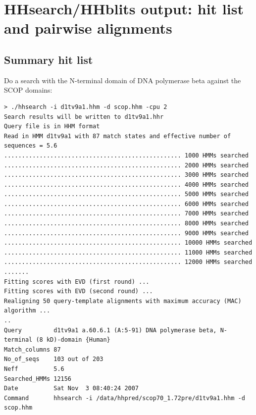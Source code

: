 \documentclass[11pt,a4paper]{article}
\begin{document}
\section{HHsearch/HHblits output: hit list and pairwise alignments}

\subsection{Summary hit list}

Do a search with the N-terminal domain of DNA polymerase beta against the SCOP domains:


\scriptsize\begin{verbatim}
> ./hhsearch -i d1tv9a1.hhm -d scop.hhm -cpu 2
Search results will be written to d1tv9a1.hhr
Query file is in HHM format
Read in HMM d1tv9a1 with 87 match states and effective number of sequences = 5.6
.................................................. 1000 HMMs searched
.................................................. 2000 HMMs searched
.................................................. 3000 HMMs searched
.................................................. 4000 HMMs searched
.................................................. 5000 HMMs searched
.................................................. 6000 HMMs searched
.................................................. 7000 HMMs searched
.................................................. 8000 HMMs searched
.................................................. 9000 HMMs searched
.................................................. 10000 HMMs searched
.................................................. 11000 HMMs searched
.................................................. 12000 HMMs searched
.......
Fitting scores with EVD (first round) ...
Fitting scores with EVD (second round) ...
Realigning 50 query-template alignments with maximum accuracy (MAC) algorithm ...
..
Query         d1tv9a1 a.60.6.1 (A:5-91) DNA polymerase beta, N-terminal (8 kD)-domain {Human} 
Match_columns 87
No_of_seqs    103 out of 203
Neff          5.6 
Searched_HMMs 12156
Date          Sat Nov  3 08:40:24 2007
Command       hhsearch -i /data/hhpred/scop70_1.72pre/d1tv9a1.hhm -d scop.hhm 


\end{verbatim}
\end{document}
